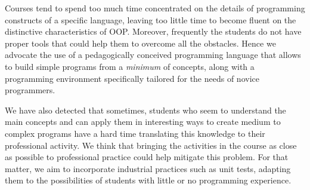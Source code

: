 
Courses tend to spend too much time concentrated on the details of programming constructs of a specific language, leaving too little time to become fluent on the distinctive characteristics of OOP. 
Moreover, frequently the students do not have proper tools that could help them to overcome all the obstacles.
Hence we advocate the use of a pedagogically conceived programming language that allows to build simple programs from a \emph{minimum} of concepts, along with a programming environment specifically tailored for the needs of novice programmers.

\medskip




We have also detected that sometimes, students who seem to understand the main concepts and can apply them in interesting ways to create medium to complex programs have a hard time translating this knowledge to their professional activity.
We think that bringing the activities in the course as close as possible to professional practice could help mitigate this problem.
For that matter, we aim to incorporate industrial practices such as 
unit tests, adapting them to the possibilities of students with little or no programming experience.


